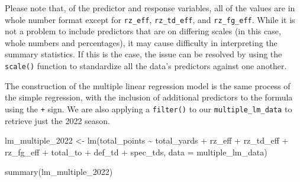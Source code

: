 \documentclass[
  letterpaper,
]{krantz}
\newenvironment{Shaded}{\begin{snugshade}}{\end{snugshade}}
\newcommand{\AttributeTok}[1]{\textcolor[rgb]{0.40,0.45,0.13}{#1}}
\newcommand{\FunctionTok}[1]{\textcolor[rgb]{0.28,0.35,0.67}{#1}}
\newcommand{\NormalTok}[1]{\textcolor[rgb]{0.00,0.23,0.31}{#1}}
\newcommand{\OtherTok}[1]{\textcolor[rgb]{0.00,0.23,0.31}{#1}}
\newcommand{\SpecialCharTok}[1]{\textcolor[rgb]{0.37,0.37,0.37}{#1}}
\begin{document}
\begin{tcolorbox}[enhanced jigsaw, left=2mm, toprule=.15mm, opacitybacktitle=0.6, leftrule=.75mm, bottomrule=.15mm, colbacktitle=quarto-callout-caution-color!10!white, breakable, colback=white, bottomtitle=1mm, toptitle=1mm, title=\textcolor{quarto-callout-caution-color}{\faFire}\hspace{0.5em}{Caution}, coltitle=black, titlerule=0mm, arc=.35mm, opacityback=0, colframe=quarto-callout-caution-color-frame, rightrule=.15mm]

Please note that, of the predictor and response variables, all of the
values are in whole number format except for \texttt{rz\_eff},
\texttt{rz\_td\_eff}, and \texttt{rz\_fg\_eff}. While it is not a
problem to include predictors that are on differing scales (in this
case, whole numbers and percentages), it may cause difficulty in
interpreting the summary statistics. If this is the case, the issue can
be resolved by using the \texttt{scale()} function to standardize all
the data's predictors against one another.

\end{tcolorbox}

The construction of the multiple linear regression model is the same
process of the simple regression, with the inclusion of additional
predictors to the formula using the \texttt{+} sign. We are also
applying a \texttt{filter()} to our \texttt{multiple\_lm\_data} to
retrieve just the 2022 season.

\begin{Shaded}
\begin{Highlighting}[]
\NormalTok{lm\_multiple\_2022 }\OtherTok{\textless{}{-}} \FunctionTok{lm}\NormalTok{(total\_points }\SpecialCharTok{\textasciitilde{}}\NormalTok{ total\_yards }\SpecialCharTok{+}\NormalTok{ rz\_eff }\SpecialCharTok{+}\NormalTok{ rz\_td\_eff }\SpecialCharTok{+}\NormalTok{ rz\_fg\_eff}
                       \SpecialCharTok{+}\NormalTok{ total\_to }\SpecialCharTok{+}\NormalTok{ def\_td }\SpecialCharTok{+}\NormalTok{ spec\_tds, }\AttributeTok{data =}\NormalTok{ multiple\_lm\_data)}

\FunctionTok{summary}\NormalTok{(lm\_multiple\_2022)}
\end{Highlighting}
\end{Shaded}
\end{document}
